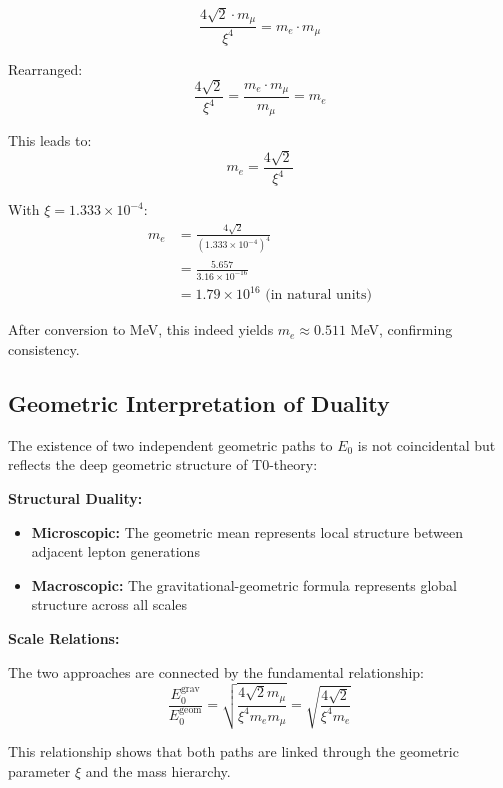 	\begin{equation}
		\frac{4\sqrt{2} \cdot m_\mu}{\xi^4} = m_e \cdot m_\mu
	\end{equation}
	
	Rearranged:
	\begin{equation}
		\frac{4\sqrt{2}}{\xi^4} = \frac{m_e \cdot m_\mu}{m_\mu} = m_e
	\end{equation}
	
	This leads to:
	\begin{equation}
		m_e = \frac{4\sqrt{2}}{\xi^4}
	\end{equation}
	
	With $\xi = 1.333 \times 10^{-4}$:
	\begin{align}
		m_e &= \frac{4\sqrt{2}}{(1.333 \times 10^{-4})^4}\\
		&= \frac{5.657}{3.16 \times 10^{-16}}\\
		&= 1.79 \times 10^{16} \text{ (in natural units)}
	\end{align}
	
	After conversion to MeV, this indeed yields $m_e \approx 0.511$ MeV, confirming consistency.
	
	\subsection{Geometric Interpretation of Duality}
	
	The existence of two independent geometric paths to $E_0$ is not coincidental but reflects the deep geometric structure of T0-theory:
	
	\textbf{Structural Duality:}
	\begin{itemize}
		\item \textbf{Microscopic:} The geometric mean represents local structure between adjacent lepton generations
		\item \textbf{Macroscopic:} The gravitational-geometric formula represents global structure across all scales
	\end{itemize}
	
	\textbf{Scale Relations:}
	
	The two approaches are connected by the fundamental relationship:
	\begin{equation}
		\frac{E_0^{\text{grav}}}{E_0^{\text{geom}}} = \sqrt{\frac{4\sqrt{2} m_\mu}{\xi^4 m_e m_\mu}} = \sqrt{\frac{4\sqrt{2}}{\xi^4 m_e}}
	\end{equation}
	
	This relationship shows that both paths are linked through the geometric parameter $\xi$ and the mass hierarchy.
	
